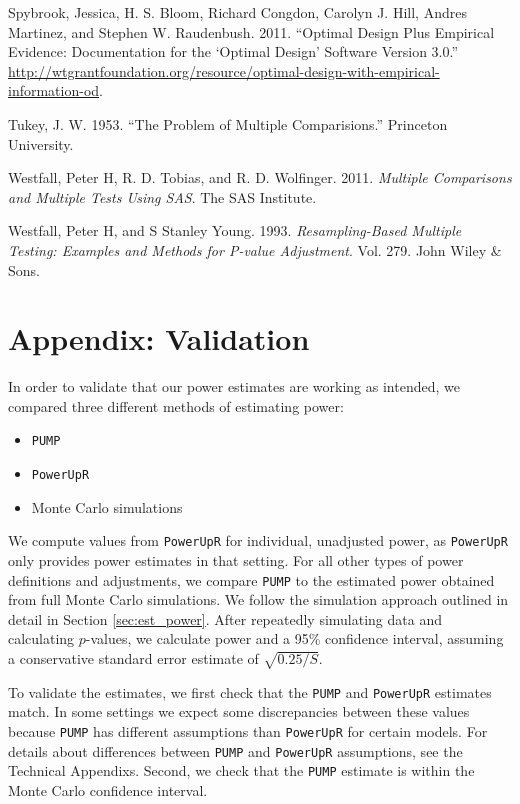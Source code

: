 \documentclass[
]{article}
\providecommand{\tightlist}{%
  \setlength{\itemsep}{0pt}\setlength{\parskip}{0pt}}
\newlength{\cslhangindent}
\newlength{\cslentryspacingunit} %
\newenvironment{CSLReferences}[2] %
 {%
  \setlength{\parindent}{0pt}
  \ifodd #1
  \let\oldpar\par
  \def\par{\hangindent=\cslhangindent\oldpar}
  \fi
  \setlength{\parskip}{#2\cslentryspacingunit}
 }%
 {}
\begin{document}
\begin{CSLReferences}{1}{0}
\leavevmode{}%
Spybrook, Jessica, H. S. Bloom, Richard Congdon, Carolyn J. Hill, Andres
Martinez, and Stephen W. Raudenbush. 2011. {``Optimal Design Plus
Empirical Evidence: Documentation for the {`Optimal Design'} Software
Version 3.0.''}
\url{http://wtgrantfoundation.org/resource/optimal-design-with-empirical-information-od}.

\leavevmode{}%
Tukey, J. W. 1953. {``The Problem of Multiple Comparisions.''} Princeton
University.

\leavevmode{}%
Westfall, Peter H, R. D. Tobias, and R. D. Wolfinger. 2011.
\emph{Multiple Comparisons and Multiple Tests Using SAS}. The SAS
Institute.

\leavevmode{}%
Westfall, Peter H, and S Stanley Young. 1993. \emph{Resampling-Based
Multiple Testing: Examples and Methods for {P-value} Adjustment}. Vol.
279. John Wiley \& Sons.

\end{CSLReferences}

\section{Appendix: Validation}

In order to validate that our power estimates are working as intended,
we compared three different methods of estimating power:

\begin{itemize}
\tightlist
\item
  \texttt{PUMP}
\item
  \texttt{PowerUpR}
\item
  Monte Carlo simulations
\end{itemize}

We compute values from \texttt{PowerUpR} for individual, unadjusted
power, as \texttt{PowerUpR} only provides power estimates in that
setting. For all other types of power definitions and adjustments, we
compare \texttt{PUMP} to the estimated power obtained from full Monte
Carlo simulations. We follow the simulation approach outlined in detail
in Section \ref{sec:est_power}. After repeatedly simulating data and
calculating \(p\)-values, we calculate power and a 95\% confidence
interval, assuming a conservative standard error estimate of
\(\sqrt{0.25/S}\).

To validate the estimates, we first check that the \texttt{PUMP} and
\texttt{PowerUpR} estimates match. In some settings we expect some
discrepancies between these values because \texttt{PUMP} has different
assumptions than \texttt{PowerUpR} for certain models. For details about
differences between \texttt{PUMP} and \texttt{PowerUpR} assumptions, see
the Technical Appendixs. Second, we check that the \texttt{PUMP}
estimate is within the Monte Carlo confidence interval.
\end{document}
